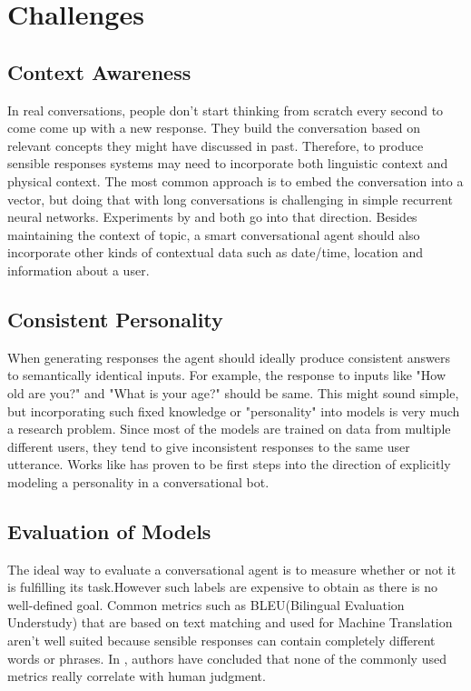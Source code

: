 \documentclass[letterpaper] {article} %
\begin{document}
\section{Challenges}
\subsection{Context Awareness}
In real conversations, people don't start thinking from scratch every second to come come up with a new response. They build the conversation based on relevant concepts they might have discussed in past. Therefore, to produce sensible responses systems may need to incorporate both linguistic context and physical context. The most common approach is to embed the conversation into a vector, but doing that with long conversations is challenging in simple recurrent neural networks. Experiments by \cite{serban2016building} and \cite{yao2015attention} both go into that direction. Besides maintaining the context of topic, a smart conversational agent should also incorporate other kinds of contextual data such as date/time, location and information about a user.

\subsection{Consistent Personality}
When generating responses the agent should ideally produce consistent answers to semantically identical inputs. For example, the response to inputs like "How old are you?" and "What is your age?" should be same. This might sound simple, but incorporating such fixed knowledge or "personality" into models is very much a research problem. Since most of the models are trained on data from multiple different users, they tend to give inconsistent responses to the same user utterance. Works like \cite{li2016persona} has proven to be first steps into the direction of explicitly modeling a personality in a conversational bot.
\subsection{Evaluation of Models}
The ideal way to evaluate a conversational agent is to measure whether or not it is fulfilling its task.However such labels are expensive to obtain as there is no well-defined goal. Common metrics such as BLEU(Bilingual Evaluation Understudy) that are based on text matching and used for Machine Translation aren’t well suited because sensible responses can contain completely different words or phrases. In \cite{liu2016not}, authors have concluded that none of the commonly used metrics really correlate with human judgment.
\end{document}
